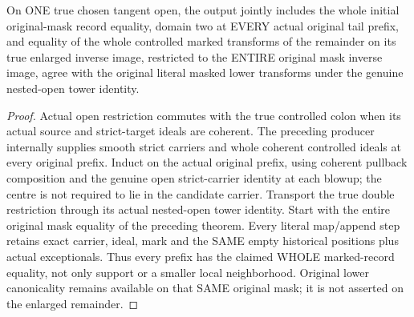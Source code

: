 \begin{theorem}
\label{hir:zero-contact-remainder-whole-masked-prefixes}
\leanok
{}
On ONE true chosen tangent open, the output jointly includes the whole initial
original-mask record equality, domain two at EVERY actual original tail prefix,
and equality of the whole controlled marked transforms
of the remainder on its true enlarged inverse image, restricted to the
ENTIRE original mask inverse image, agree with the original literal masked
lower transforms under the genuine nested-open tower identity.
\end{theorem}
\begin{proof}
Actual open restriction commutes with the true controlled colon when its
actual source and strict-target ideals are coherent. The preceding producer
internally supplies smooth strict carriers and whole coherent controlled
ideals at every original prefix. Induct on the actual original prefix, using
coherent pullback composition and the genuine open strict-carrier identity
at each blowup; the centre is not required to lie in the candidate carrier.
Transport the true double restriction through its actual nested-open tower
identity. Start with the entire original mask equality of the preceding
theorem. Every literal map/append step retains exact carrier, ideal, mark
and the SAME empty historical positions plus actual exceptionals. Thus every
prefix has the claimed WHOLE marked-record equality, not only support or a
smaller local neighborhood. Original lower canonicality remains available
on that SAME original mask; it is not asserted on the enlarged remainder.
\end{proof}

